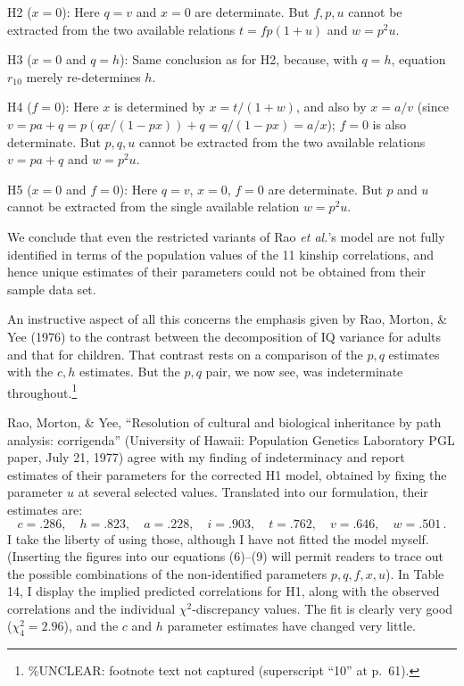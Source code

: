 ﻿\documentclass[12pt]{article}
\begin{document}
H2 ($x=0$): Here $q=v$ and $x=0$ are determinate. But $f,p,u$ cannot be extracted from the two available relations $t=fp(1+u)$ and $w=p^2u$.

H3 ($x=0$ and $q=h$): Same conclusion as for H2, because, with $q=h$, equation $r_{10}$ merely re-determines $h$.

H4 ($f=0$): Here $x$ is determined by $x=t/(1+w)$, and also by $x=a/v$ (since $v=pa+q=p(qx/(1-px))+q=q/(1-px)=a/x$); $f=0$ is also determinate. But $p,q,u$ cannot be extracted from the two available relations $v=pa+q$ and $w=p^2u$.

H5 ($x=0$ and $f=0$): Here $q=v$, $x=0$, $f=0$ are determinate. But $p$ and $u$ cannot be extracted from the single available relation $w=p^2u$.

We conclude that even the restricted variants of Rao \emph{et al.}'s model are not fully identified in terms of the population values of the 11 kinship correlations, and hence unique estimates of their parameters could not be obtained from their sample data set.

An instructive aspect of all this concerns the emphasis given by Rao, Morton, \& Yee (1976) to the contrast between the decomposition of IQ variance for adults and that for children. That contrast rests on a comparison of the $p,q$ estimates with the $c,h$ estimates. But the $p,q$ pair, we now see, was indeterminate throughout.\footnote{\%UNCLEAR: footnote text not captured (superscript ``10'' at p.\ 61).}

Rao, Morton, \& Yee, ``Resolution of cultural and biological inheritance by path analysis: corrigenda'' (University of Hawaii: Population Genetics Laboratory PGL paper, July 21, 1977) agree with my finding of indeterminacy and report estimates of their parameters for the corrected H1 model, obtained by fixing the parameter $u$ at several selected values. Translated into our formulation, their estimates are:
\begin{equation*}
c=.286, \quad h=.823, \quad a=.228, \quad i=.903, \quad t=.762, \quad v=.646, \quad w=.501 \, .
\end{equation*}
I take the liberty of using those, although I have not fitted the model myself. (Inserting the figures into our equations (6)--(9) will permit readers to trace out the possible combinations of the non-identified parameters $p,q,f,x,u$). In Table 14, I display the implied predicted correlations for H1, along with the observed correlations and the individual $\chi^2$-discrepancy values. The fit is clearly very good ($\chi_4^2=2.96$), and the $c$ and $h$ parameter estimates have changed very little.
\end{document}

